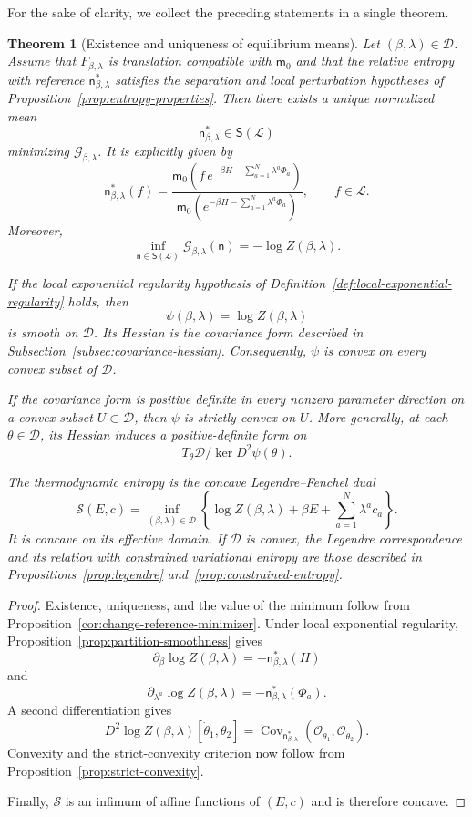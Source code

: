 \documentclass[11pt,reqno]{amsart}
\newtheorem{Theorem}{Theorem}[section]
\begin{document}
For the sake of clarity, we collect the preceding statements in a
single theorem.

\begin{Theorem}[Existence and uniqueness of equilibrium means]
\label{thm:existence}
Let $(\beta,\lambda)\in\mathcal D$. Assume that
$F_{\beta,\lambda}$ is translation compatible with $\mathsf m_0$ and
that the relative entropy with reference
$\mathsf n_{\beta,\lambda}^*$ satisfies the separation and local
perturbation hypotheses of
Proposition~\ref{prop:entropy-properties}. Then there exists a unique
normalized mean
\[
\mathsf n_{\beta,\lambda}^{*}\in\mathsf S(\mathcal L)
\]
minimizing $\mathcal G_{\beta,\lambda}$. It is explicitly given by
\[
\boxed{
\mathsf n_{\beta,\lambda}^{*}(f)
=
\frac{
\mathsf m_0\left(
f\,e^{-\beta H-\sum_{a=1}^{N}\lambda^a\Phi_a}
\right)
}{
\mathsf m_0\left(
e^{-\beta H-\sum_{a=1}^{N}\lambda^a\Phi_a}
\right)
},
\qquad
f\in\mathcal L.
}
\]
Moreover,
\[
\inf_{\mathsf n\in\mathsf S(\mathcal L)}
\mathcal G_{\beta,\lambda}(\mathsf n)
=
-\log Z(\beta,\lambda).
\]

If the local exponential regularity hypothesis of
Definition~\ref{def:local-exponential-regularity} holds, then
\[
\psi(\beta,\lambda)
=
\log Z(\beta,\lambda)
\]
is smooth on $\mathcal D$. Its Hessian is the covariance form described
in Subsection~\ref{subsec:covariance-hessian}. Consequently, $\psi$ is
convex on every convex subset of $\mathcal D$.

If the covariance form is positive definite in every nonzero parameter
direction on a convex subset $U\subset\mathcal D$, then $\psi$ is
strictly convex on $U$. More generally, at each
$\theta\in\mathcal D$, its Hessian induces a positive-definite form on
\[
T_\theta\mathcal D\big/\ker D^2\psi(\theta).
\]

The thermodynamic entropy is the concave Legendre--Fenchel dual
\[
\mathcal S(E,c)
=
\inf_{(\beta,\lambda)\in\mathcal D}
\left\{
\log Z(\beta,\lambda)
+
\beta E
+
\sum_{a=1}^{N}\lambda^a c_a
\right\}.
\]
It is concave on its effective domain. If $\mathcal D$ is convex, the
Legendre correspondence and its relation with constrained variational
entropy are those described in
Propositions~\ref{prop:legendre} and~\ref{prop:constrained-entropy}.
\end{Theorem}

\begin{proof}
Existence, uniqueness, and the value of the minimum follow from
Proposition~\ref{cor:change-reference-minimizer}. Under local
exponential regularity,
Proposition~\ref{prop:partition-smoothness} gives
\[
\partial_\beta\log Z(\beta,\lambda)
=
-\mathsf n_{\beta,\lambda}^{*}(H)
\]
and
\[
\partial_{\lambda^a}\log Z(\beta,\lambda)
=
-\mathsf n_{\beta,\lambda}^{*}(\Phi_a).
\]
A second differentiation gives
\[
D^2\log Z(\beta,\lambda)
[\dot\theta_1,\dot\theta_2]
=
\operatorname{Cov}_{\mathsf n_{\beta,\lambda}^{*}}
\left(
\mathcal O_{\dot\theta_1},
\mathcal O_{\dot\theta_2}
\right).
\]
Convexity and the strict-convexity criterion now follow from
Proposition~\ref{prop:strict-convexity}.

Finally, $\mathcal S$ is an infimum of affine functions of $(E,c)$ and
is therefore concave.
\end{proof}
\end{document}
